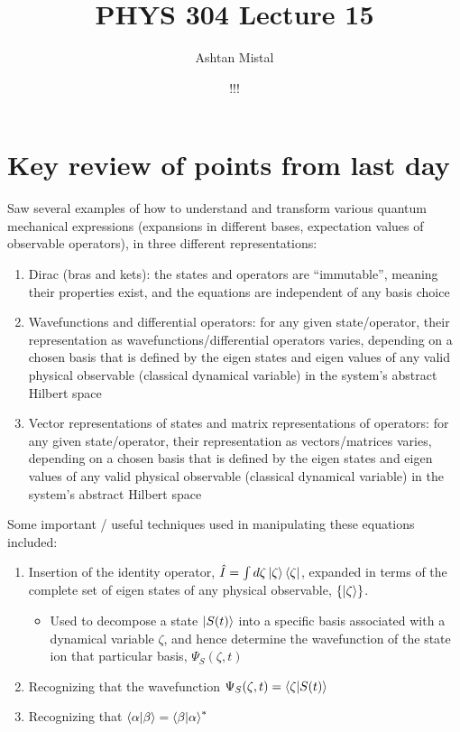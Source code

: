 \documentclass{article}
\title{PHYS 304 Lecture 15}
\author{Ashtan Mistal}
\date{!!!}
\begin{document}
\ifstandalone
\maketitle
\fi

\graphicspath{{./Lecture15/}}

\section{Key review of points from last day}

Saw several examples of how to understand and transform various quantum mechanical expressions (expansions in different bases, expectation values of observable operators), in three different representations:

\begin{enumerate}
    \item Dirac (bras and kets): the states and operators are “immutable”, meaning their properties exist, and the equations are independent of any basis choice
    \item Wavefunctions and differential operators: for any given state/operator, their representation as wavefunctions/differential operators varies, depending on a chosen basis that is defined by the eigen states and eigen values of any valid physical observable (classical dynamical variable) in the system’s abstract Hilbert space
    \item Vector representations of states and matrix representations of operators: for any given state/operator, their representation as vectors/matrices varies, depending on a chosen basis that is defined by the eigen states and eigen values of any valid physical observable (classical dynamical variable) in the system’s abstract Hilbert space
\end{enumerate}

Some important / useful techniques used in manipulating these equations included:

\begin{enumerate}
    \item Insertion of the identity operator, $\hat{I} = \int d \zeta \ket{\zeta} \bra{\zeta}$, expanded in terms of the complete set of eigen states of any physical observable, $\{\ket{\zeta}\}$.
    \begin{itemize}
        \item Used to decompose a state $\ket{S(t)}$ into a specific basis associated with a dynamical variable $\zeta$, and hence  determine the wavefunction of the state ion that particular basis, $\Psi_S (\zeta, t)$
    \end{itemize}
    \item Recognizing that the wavefunction $\Psi_S(\zeta, t) = \braket{\zeta | S(t)}$
    \item Recognizing that $\braket{\alpha|\beta} = \braket{\beta|\alpha}^*$
\end{enumerate}
\end{document}
